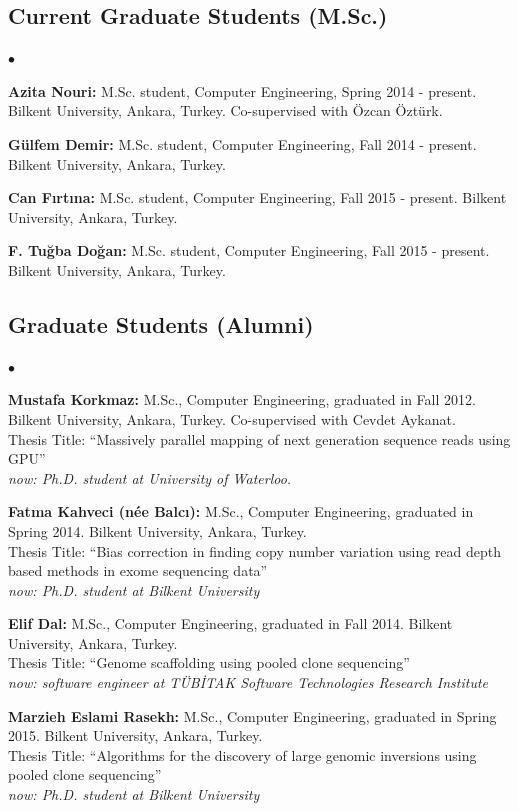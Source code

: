\documentclass[margin,line]{res}
\newenvironment{list2}{
  \begin{list}{$\bullet$}{%
      \setlength{\itemsep}{0in}
      \setlength{\parsep}{0in} \setlength{\parskip}{0in}
      \setlength{\topsep}{0in} \setlength{\partopsep}{0in} 
      \setlength{\leftmargin}{0.2in}}}{\end{list}}
\begin{document}
\begin{resume}
\subsection{\small \sc Current Graduate Students (M.Sc.)}
\begin{list2}
\item
  {\bf Azita Nouri:} M.Sc. student, Computer Engineering, Spring 2014 - present.
  Bilkent University, Ankara, Turkey. Co-supervised with Özcan Öztürk.
\item
  {\bf Gülfem Demir:} M.Sc. student, Computer Engineering, Fall 2014 - present.
  Bilkent University, Ankara, Turkey. 
\item
  {\bf Can Fırtına:} M.Sc. student, Computer Engineering, Fall 2015 - present.
  Bilkent University, Ankara, Turkey. 
\item
  {\bf F. Tuğba Doğan:} M.Sc. student, Computer Engineering, Fall 2015 - present.
  Bilkent University, Ankara, Turkey. 
\end{list2}

\vspace*{-.4cm}
\subsection{\small \sc Graduate Students (Alumni)}
\begin{list2}
\item
 {\bf Mustafa Korkmaz:} M.Sc., Computer Engineering, graduated in Fall 2012.
  Bilkent University, Ankara, Turkey. Co-supervised with Cevdet Aykanat.\\
  Thesis Title: ``Massively parallel mapping of next generation sequence reads using GPU''\\
  {\it now: Ph.D. student at University of Waterloo.}
\item
  {\bf Fatma Kahveci (n\'{e}e Balc{\i}):} M.Sc., Computer Engineering, graduated in Spring 2014.
  Bilkent University, Ankara, Turkey.\\
  Thesis Title: ``Bias correction in finding copy number variation using read depth based methods in exome sequencing data''\\
  {\it now: Ph.D. student at Bilkent University}
\item
  {\bf Elif Dal:} M.Sc., Computer Engineering, graduated in Fall 2014.
  Bilkent University, Ankara, Turkey.\\
  Thesis Title: ``Genome scaffolding using pooled clone sequencing''\\
  {\it now: software engineer at TÜBİTAK Software Technologies Research Institute}
\clearpage
\item
  {\bf Marzieh Eslami Rasekh:} M.Sc., Computer Engineering, graduated in Spring 2015.
  Bilkent University, Ankara, Turkey.\\
  Thesis Title: ``Algorithms for the discovery of large genomic inversions using pooled clone sequencing''\\
  {\it now: Ph.D. student at Bilkent University}
\end{list2}


\end{resume}
\end{document}
